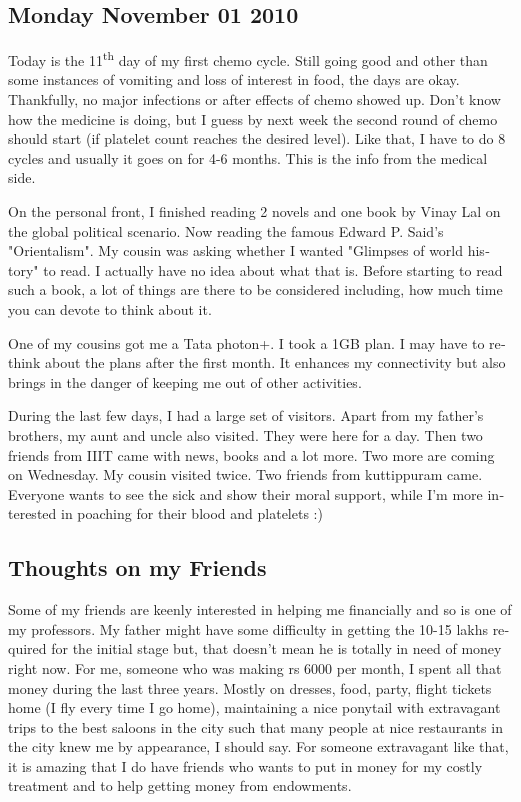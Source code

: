 \vskip 2pt
\begin{english}
\subsection*{Monday November 01 2010}

Today is the 11\textsuperscript{th} day of my first chemo cycle. Still going good and other
than some instances of vomiting and loss of interest in food, the days are okay.
Thankfully, no major infections or after effects of chemo showed up. 
Don't know how the medicine is doing, but I guess by next week the second 
round of chemo should start (if platelet count reaches the desired level). 
Like that, I have to do 8 cycles and usually it goes on for 4-6 months. 
This is the info from the medical side.

On the personal front, I finished reading 2 novels and one book by Vinay 
Lal on the global political scenario. Now reading the famous Edward P. Said's 
"Orientalism". My cousin was asking whether I wanted "Glimpses of world history" 
to read. I actually have no idea about what that is. Before starting to read such a book, 
a lot of things are there to be considered including, how much time you can devote to 
think about it. 

One of my cousins got me a Tata photon+. I took a 1GB plan. I may have to rethink 
about the plans after the first month. It enhances my connectivity but also brings 
in the danger of keeping me out of other activities.

During the last few days, I had a large set of visitors. Apart from my father's brothers,
my aunt and uncle also visited. They were here for a day. Then two friends from IIIT 
came with news, books and a lot more. Two more are coming on Wednesday. My cousin visited 
twice. Two friends from kuttippuram came. Everyone wants to see the sick and 
show their moral support, while I'm more interested in poaching for their blood and 
platelets :) 

\subsection*{Thoughts on my Friends}

Some of my friends are keenly interested in helping me financially and so is one of my professors. 
My father might have some difficulty in getting the 10-15 lakhs required for the initial stage 
but, that doesn't mean he is totally in need of money right now. For me, someone who was making 
rs 6000 per month, I spent all that money during the last three years. Mostly on dresses, food, party, 
flight tickets home (I fly every time I go home), maintaining a nice ponytail with extravagant trips to the best 
saloons in the city such that many people at nice restaurants in the city knew me by appearance, I should say. 
For someone extravagant like that, it is amazing that I do have friends who wants to put in money 
for my costly treatment and to help getting money from endowments. 


\end{english}
